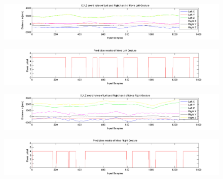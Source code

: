 \begin{figure}
	[h] 	
	\centerline{\includegraphics[width=180mm]{figures/result/test-axis-move-left.jpg}}
\end{figure}
\begin{figure}
	[h] 	
	\centerline{\includegraphics[width=180mm]{figures/result/test-prediction-move-left.jpg}}
\end{figure}
\begin{figure}
	[h] 	
	\centerline{\includegraphics[width=180mm]{figures/result/test-axis-move-right.jpg}}
\end{figure}
\begin{figure}
	[h] 	
	\centerline{\includegraphics[width=180mm]{figures/result/test-prediction-move-right.jpg}}
\end{figure}


